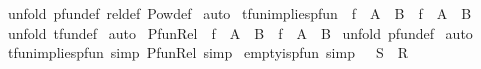 \begin{isabellebody}
%
\isadelimproof
%
\endisadelimproof
%
\isatagproof
{}\isamarkupfalse%
\ {\isacharparenleft}unfold\ pfun{\isacharunderscore}def\ rel{\isacharunderscore}def\ Pow{\isacharunderscore}def{\isacharparenright}\isanewline
{}\isamarkupfalse%
\ auto\isanewline
{}\isamarkupfalse%
%
\endisatagproof
{\isafoldproof}%
%
\isadelimproof
\isanewline
%
\endisadelimproof
\isanewline
\isanewline
{}\isamarkupfalse%
\ tfun{\isacharunderscore}implies{\isacharunderscore}pfun{\isacharcolon}\ {\isachardoublequoteopen}\ f\ {\isacharcolon}\ A\ {\isacharminus}{\isacharminus}{\isacharminus}{\isachargreater}\ B\ {\isacharequal}{\isacharequal}{\isachargreater}\ f\ {\isacharcolon}\ A\ {\isacharminus}{\isacharbar}{\isacharminus}{\isachargreater}\ B{\isachardoublequoteclose}\isanewline
%
\isadelimproof
%
\endisadelimproof
%
\isatagproof
{}\isamarkupfalse%
\ {\isacharparenleft}unfold\ tfun{\isacharunderscore}def{\isacharparenright}\isanewline
{}\isamarkupfalse%
\ auto\isanewline
{}\isamarkupfalse%
%
\endisatagproof
{\isafoldproof}%
%
\isadelimproof
\isanewline
%
\endisadelimproof
\isanewline
\isanewline
{}\isamarkupfalse%
\ Pfun{\isacharunderscore}Rel{\isacharcolon}\ {\isachardoublequoteopen}\ f\ {\isacharcolon}\ {\isacharparenleft}A\ {\isacharminus}{\isacharbar}{\isacharminus}{\isachargreater}\ B{\isacharparenright}\ {\isacharequal}{\isacharequal}{\isachargreater}\ f\ {\isacharcolon}\ {\isacharparenleft}A\ {\isacharless}{\isacharminus}{\isacharminus}{\isachargreater}\ B{\isacharparenright}{\isachardoublequoteclose}\isanewline
%
\isadelimproof
%
\endisadelimproof
%
\isatagproof
{}\isamarkupfalse%
\ {\isacharparenleft}unfold\ pfun{\isacharunderscore}def{\isacharparenright}\isanewline
{}\isamarkupfalse%
\ auto\isanewline
{}\isamarkupfalse%
%
\endisatagproof
{\isafoldproof}%
%
\isadelimproof
\isanewline
%
\endisadelimproof
{}\isamarkupfalse%
\ tfun{\isacharunderscore}implies{\isacharunderscore}pfun\ {\isacharbrackleft}simp{\isacharbrackright}\ Pfun{\isacharunderscore}Rel\ {\isacharbrackleft}simp{\isacharbrackright}\isanewline
\isanewline
\isanewline
\isanewline
\isanewline
\isanewline
{}\isamarkupfalse%
\ empty{\isacharunderscore}is{\isacharunderscore}pfun\ {\isacharbrackleft}simp{\isacharbrackright}{\isacharcolon}\ {\isachardoublequoteopen}{\isacharbraceleft}{\isacharbraceright}\ {\isacharcolon}\ {\isacharparenleft}S\ {\isacharminus}{\isacharbar}{\isacharminus}{\isachargreater}\ R{\isacharparenright}{\isachardoublequoteclose}\isanewline

\end{isabellebody}
